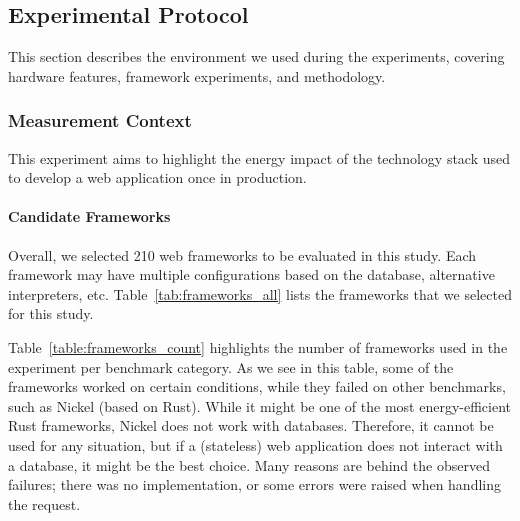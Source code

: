 
\subsection{Experimental Protocol}
This section describes the environment we used during the experiments, covering hardware features, framework experiments, and methodology.

\subsubsection{Measurement Context}
This experiment aims to highlight the energy impact of the technology stack used to develop a web application once in production.



\paragraph{Candidate Frameworks}
Overall, we selected 210 web frameworks to be evaluated in this study.
Each framework may have multiple configurations based on the database, alternative interpreters, etc.
Table~\ref{tab:frameworks_all} lists the frameworks that we selected for this study.




% 

Table~\ref{table:frameworks_count} highlights the number of frameworks used in the experiment per benchmark category.
As we see in this table, some of the frameworks worked on certain conditions, while they failed on other benchmarks, such as Nickel (based on Rust).
While it might be one of the most energy-efficient Rust frameworks, Nickel does not work with databases.
Therefore, it cannot be used for any situation, but if a (stateless) web application does not interact with a database, it might be the best choice.
Many reasons are behind the observed failures; there was no implementation, or some errors were raised when handling the request.




